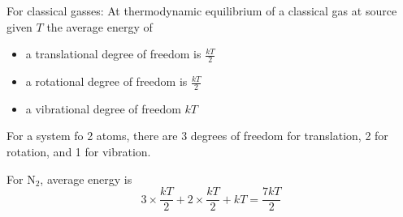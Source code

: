\documentclass[12pt]{article}
\begin{document}
For classical gasses: At thermodynamic equilibrium of a classical gas at source given $T$ the average energy of

\begin{itemize}
	\item a translational degree of freedom is $\frac{kT}{2}$
	\item a rotational degree of freedom is $\frac{kT}{2}$
	\item a vibrational degree of freedom $kT$
\end{itemize}

\begin{ex}
	For a system fo 2 atoms, there are 3 degrees of freedom for translation, 2 for rotation, and 1 for vibration.
\end{ex}

\begin{ex}
	For N$_2$, average energy is
	$$3\times \frac{kT}{2} + 2\times \frac{kT}{2} + kT = \frac{7kT}{2}$$
\end{ex}
\end{document}

